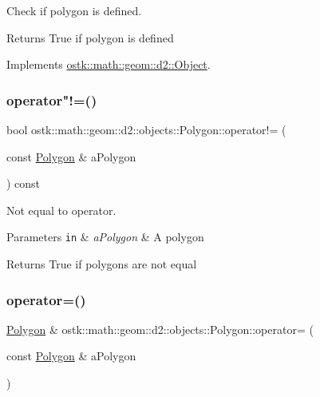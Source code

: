 Check if polygon is defined. 

\begin{DoxyReturn}{Returns}
True if polygon is defined 
\end{DoxyReturn}


Implements \hyperlink{classostk_1_1math_1_1geom_1_1d2_1_1_object_a456cc7121218d24c1322d0fe54230cc4}{ostk\+::math\+::geom\+::d2\+::\+Object}.

\mbox{\label{classostk_1_1math_1_1geom_1_1d2_1_1objects_1_1_polygon_a2a592e75608feeafd324105c65c67640}} 
\subsubsection{\texorpdfstring{operator"!=()}{operator!=()}}
{\footnotesize\ttfamily bool ostk\+::math\+::geom\+::d2\+::objects\+::\+Polygon\+::operator!= (\begin{DoxyParamCaption}\item[{const \hyperlink{classostk_1_1math_1_1geom_1_1d2_1_1objects_1_1_polygon}{Polygon} \&}]{a\+Polygon }\end{DoxyParamCaption}) const}



Not equal to operator. 


\begin{DoxyParams}[1]{Parameters}
\mbox{\tt in}  & {\em a\+Polygon} & A polygon \\
\hline
\end{DoxyParams}
\begin{DoxyReturn}{Returns}
True if polygons are not equal 
\end{DoxyReturn}
\mbox{\label{classostk_1_1math_1_1geom_1_1d2_1_1objects_1_1_polygon_aad1bdf4404a88c3da5c93e12e0cbb241}} 
\subsubsection{\texorpdfstring{operator=()}{operator=()}}
{\footnotesize\ttfamily \hyperlink{classostk_1_1math_1_1geom_1_1d2_1_1objects_1_1_polygon}{Polygon} \& ostk\+::math\+::geom\+::d2\+::objects\+::\+Polygon\+::operator= (\begin{DoxyParamCaption}\item[{const \hyperlink{classostk_1_1math_1_1geom_1_1d2_1_1objects_1_1_polygon}{Polygon} \&}]{a\+Polygon }\end{DoxyParamCaption})}



